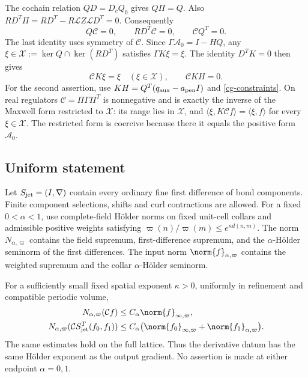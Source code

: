The cochain relation $QD=D_cQ_0$ gives $Q\Pi=Q$.
Also $RD^T\Pi=RD^T-R\mathcal LZ\mathcal LD^T=0$.
Consequently
\begin{equation}\label{cg-constraints}
 Q\mathcal C=0,\qquad RD^T\mathcal C=0,
 \qquad \mathcal C Q^T=0.
\end{equation}
The last identity uses symmetry of $\mathcal C$.
Since $\Gamma\mathcal A_0=I-HQ$, any
$\xi\in\mathcal X:=\ker Q\cap\ker(RD^T)$ satisfies
$\Gamma K\xi=\xi$. The identity $D^TK=0$ then gives
\begin{equation}\label{cg-inverse-identities}
 \mathcal CK\xi=\xi\quad(\xi\in\mathcal X),
 \qquad \mathcal CKH=0.
\end{equation}
For the second assertion, use
$KH=Q^T(q_{\rm aux}-a_{\rm pen}I)$ and
\eqref{cg-constraints}. On real regulators
$\mathcal C=\Pi\Gamma\Pi^T$ is nonnegative and is exactly
the inverse of the Maxwell form restricted to $\mathcal X$:
its range lies in $\mathcal X$, and
$\langle\xi,K\mathcal Cf\rangle=\langle\xi,f\rangle$
for every $\xi\in\mathcal X$.
The restricted form is coercive because there it equals the
positive form $\mathcal A_0$.

\subsection{Uniform statement}
\label{cg-statement}

Let $S_{\rm jet}=(I,\nabla)$ contain every ordinary fine first
difference of bond components. Finite component selections,
shifts and curl contractions are allowed. For a fixed
$0<\alpha<1$, use complete-field H\"older norms on fixed unit-cell
collars and admissible positive weights satisfying
$\varpi(n)/\varpi(m)\le e^{\kappa d(n,m)}$.
The norm $N_{\alpha,\varpi}$ contains the field supremum,
first-difference supremum, and the $\alpha$-H\"older seminorm of
the first differences. The input norm
$\norm{f}_{\alpha,\varpi}$ contains the weighted supremum and
the collar $\alpha$-H\"older seminorm.

\begin{theorem}\label{cg-schauder}
For a sufficiently small fixed spatial exponent $\kappa>0$,
uniformly in refinement and compatible periodic volume,
\begin{align}
 N_{\alpha,\varpi}(\mathcal Cf)
       &\le C_\alpha\norm{f}_{\infty,\varpi},
                                                    \label{cg-bounded}\\
 N_{\alpha,\varpi}
   (\mathcal CS_{\rm jet}^T(f_0,f_1))
       &\le C_\alpha\bigl(\norm{f_0}_{\infty,\varpi}
                          +\norm{f_1}_{\alpha,\varpi}\bigr).
                                                    \label{cg-jet}
\end{align}
The same estimates hold on the full lattice. Thus the derivative
datum has the same H\"older exponent as the output gradient.
No assertion is made at either endpoint $\alpha=0,1$.
\end{theorem}

